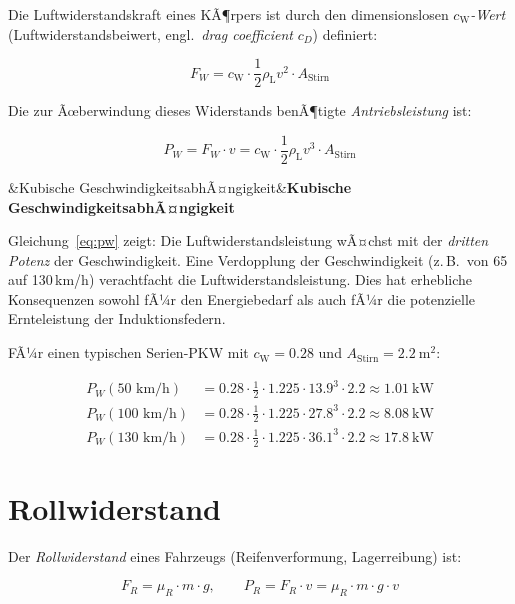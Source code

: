 ﻿\documentclass[12pt, a4paper]{report}
\newenvironment{wichtig}[1][]{%
  \begin{wichtigframe}\sloppy%
  \ifx&#1&\else\textbf{#1}\par\smallskip\fi}{\end{wichtigframe}}
\theoremstyle{definition}
\theoremstyle{remark}
\newcommand{\rhoL}{\rho_{\text{L}}}
\newcommand{\cW}{c_{\text{W}}}
\newcommand{\Astirnfl}{A_{\text{Stirn}}}
\begin{document}
Die Luftwiderstandskraft eines KÃ¶rpers ist durch den dimensionslosen
\emph{$\cW$-Wert} (Luftwiderstandsbeiwert, engl.\ \emph{drag coefficient}
$c_D$) definiert:

\begin{equation}
  F_W = \cW \cdot \frac{1}{2}\rhoL v^2 \cdot \Astirnfl
  \label{eq:fw}
\end{equation}

Die zur Ãœberwindung dieses Widerstands benÃ¶tigte \emph{Antriebsleistung} ist:

\begin{equation}
  P_W = F_W \cdot v = \cW \cdot \frac{1}{2}\rhoL v^3 \cdot \Astirnfl
  \label{eq:pw}
\end{equation}

\begin{wichtig}[Kubische GeschwindigkeitsabhÃ¤ngigkeit]
  Gleichung~\eqref{eq:pw} zeigt: Die Luftwiderstandsleistung wÃ¤chst mit der
  \emph{dritten Potenz} der Geschwindigkeit. Eine Verdopplung der Geschwindigkeit
  (z.\,B.\ von 65 auf 130\,km/h) veracht\-facht die Luftwiderstandsleistung.
  Dies hat erhebliche Konsequenzen sowohl fÃ¼r den Energiebedarf als auch fÃ¼r
  die potenzielle Ernteleistung der Induktionsfedern.
\end{wichtig}

FÃ¼r einen typischen Serien-PKW mit $\cW = 0.28$ und $\Astirnfl = \SI{2.2}{\metre\squared}$:

\begin{align}
  P_W(50\text{ km/h})  &= 0.28 \cdot \tfrac{1}{2} \cdot 1.225 \cdot 13.9^3 \cdot 2.2 \approx \SI{1.01}{\kilo\watt} \label{eq:pw50}\\
  P_W(100\text{ km/h}) &= 0.28 \cdot \tfrac{1}{2} \cdot 1.225 \cdot 27.8^3 \cdot 2.2 \approx \SI{8.08}{\kilo\watt} \label{eq:pw100}\\
  P_W(130\text{ km/h}) &= 0.28 \cdot \tfrac{1}{2} \cdot 1.225 \cdot 36.1^3 \cdot 2.2 \approx \SI{17.8}{\kilo\watt} \label{eq:pw130}
\end{align}

\section{Rollwiderstand}

Der \emph{Rollwiderstand} eines Fahrzeugs (Reifenverformung, Lagerreibung) ist:

\begin{equation}
  F_R = \mu_R \cdot m \cdot g, \qquad P_R = F_R \cdot v = \mu_R \cdot m \cdot g \cdot v
  \label{eq:roll}
\end{equation}
\end{document}
